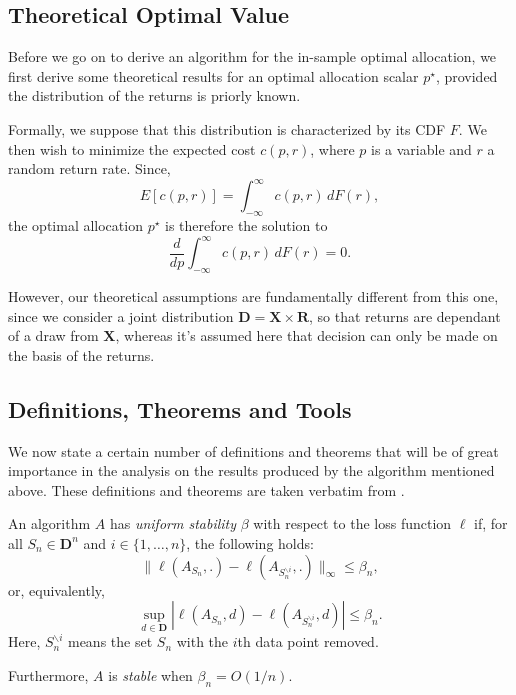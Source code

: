 \subsection{Theoretical Optimal Value}

Before we go on to derive an algorithm for the in-sample optimal allocation, we first
derive some theoretical results for an optimal allocation scalar $p^\star$, provided the
distribution of the returns is priorly known. 

Formally, we suppose that this distribution is characterized by its CDF $F$. We then wish
to minimize the expected cost $c(p,r)$, where $p$ is a variable and $r$ a random return
rate. Since,
\begin{equation}
  E[c(p,r)] = \int_{-\infty}^{\infty} c(p,r)\,dF(r),
\end{equation}
the optimal allocation $p^\star$ is therefore the solution to
\begin{equation}
  \frac{d}{dp} \int_{-\infty}^{\infty} c(p,r)\,dF(r) = 0.
\end{equation}

However, our theoretical assumptions are fundamentally different from this one, since we
consider a joint distribution $\bm D= \bm X \times \bm R$, so that returns are dependant
of a draw from $\bm X$, whereas it's assumed here that decision can only be made on the
basis of the returns. 

\subsection{Definitions, Theorems and Tools}
We now state a certain number of definitions and theorems that will be of great importance
in the analysis on the results produced by the algorithm mentioned above. These
definitions and theorems are taken verbatim from \cite{bousquet2002}.

\begin{deff}
  An algorithm $A$ has \textit{uniform stability} $\beta$ with respect to the loss
  function $\ell$ if, for all $S_n\in\bm D^n$ and $i\in\{1,\ldots,n\}$, the following
  holds:
  \begin{equation}
    \|\ell(A_{S_n},.) - \ell(A_{S^{\backslash i}_n},.)\|_{\infty} \leq \beta_n,
  \end{equation}
  or, equivalently,
  \begin{equation}
    \sup_{d\in\bm D}|\ell(A_{S_n},d) - \ell(A_{S^{\backslash i}_n},d)| \leq \beta_n.
  \end{equation}
  Here, $S^{\backslash i}_n$ means the set $S_n$ with the $i$th data point removed.

  Furthermore, $A$ is \textit{stable} when $\beta_n = O(1/n)$.
\end{deff}

